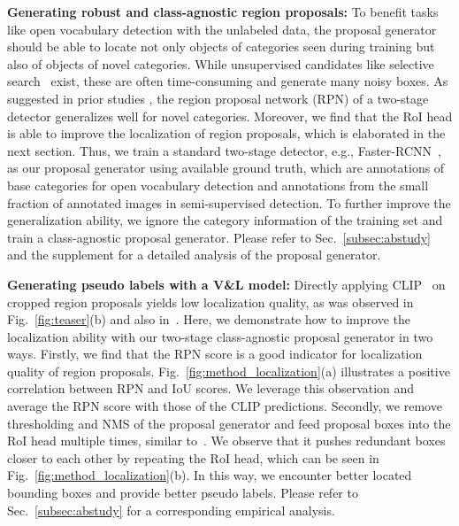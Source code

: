 \documentclass[runningheads]{llncs}
\begin{document}
\vspace{1mm}  \noindent \textbf{Generating robust and class-agnostic region proposals:}
To benefit tasks like open vocabulary detection with the unlabeled data, the proposal generator should be able to locate not only objects of categories seen during training but also of objects of novel categories.
While unsupervised candidates like selective search~\cite{Uijlings13_selectivesearch} exist, these are often time-consuming and generate many noisy boxes.
As suggested in prior studies \cite{gu_iclr_22,zareian_cvpr_21}, the region proposal network (RPN) of a two-stage detector generalizes well for novel categories. 
Moreover, we find that the RoI head is able to improve the localization of region proposals, which is elaborated in the next section.
Thus, we train a standard two-stage detector, e.g., Faster-RCNN~\cite{ren_neurips15_fasterrcnn}, as our proposal generator using available ground truth, which are annotations of base categories for open vocabulary detection and annotations from the small fraction of annotated images in semi-supervised detection. 
To further improve the generalization ability, we ignore the category information of the training set and train a class-agnostic proposal generator.
Please refer to Sec.~\ref{subsec:abstudy} and the supplement for a detailed analysis of the proposal generator.



\vspace{1mm}
\noindent \textbf{Generating pseudo labels with a V\&L model:}
Directly applying CLIP~\cite{radford_arxiv_2021} on cropped region proposals yields low localization quality, as was observed in Fig.~\ref{fig:teaser}(b) and also in~\cite{zhong2021regionclip}.
Here, we demonstrate how to improve the localization ability with our two-stage class-agnostic proposal generator in two ways.
Firstly, we find that the RPN score is a good indicator for localization quality of region proposals.  Fig.~\ref{fig:method_localization}(a) illustrates a positive correlation between RPN and IoU scores.  We leverage this observation and average the RPN score with those of the CLIP predictions.
Secondly, we remove thresholding and NMS of the proposal generator and feed proposal boxes into the RoI head multiple times, similar to~\cite{cai18cascadercnn}.
We observe that it pushes redundant boxes closer to each other by repeating the RoI head, which can be seen in Fig.~\ref{fig:method_localization}(b).
In this way, we encounter better located bounding boxes and provide better pseudo labels.  Please refer to Sec.~\ref{subsec:abstudy} for a corresponding empirical analysis.
\end{document}

